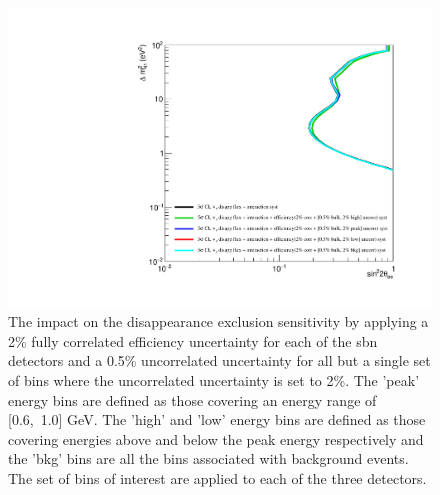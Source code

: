 \begin{figure}[h!]
    \centering
    \includegraphics[width = \largefigwidth]{figures-chap6/exclusion_contours/efficiency_systematics/nue_disapp_2pct_cor_05pct_bulk_2pct_X_uncor.pdf}
    \caption[\nue disapp with poorly constrained efficiency systematic for a set of bins.]{The impact on the \nue disappearance exclusion sensitivity by applying a 2\% fully correlated efficiency uncertainty for each of the \gls{sbn} detectors and a 0.5\% uncorrelated uncertainty for all but a single set of bins where the uncorrelated uncertainty is set to 2\%. The 'peak' energy bins are defined as those covering an energy range of [0.6,~1.0] GeV. The 'high' and 'low' energy bins are defined as those covering energies above and below the peak energy respectively and the 'bkg' bins are all the bins associated with background events. The set of bins of interest are applied to each of the three detectors.}
    
    \label{fig:my_label}
\end{figure}

